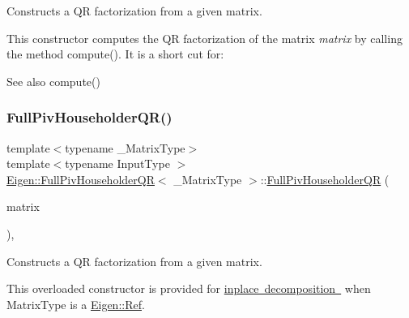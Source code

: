 Constructs a QR factorization from a given matrix. 

This constructor computes the QR factorization of the matrix {\itshape matrix} by calling the method compute(). It is a short cut for\+:


\begin{DoxyCode}{0}
\end{DoxyCode}


\begin{DoxySeeAlso}{See also}
compute() 
\end{DoxySeeAlso}
\mbox{\label{class_eigen_1_1_full_piv_householder_q_r_ac9bdb4f7fa77c1aa16f238592c248e70}} 
\subsubsection{\texorpdfstring{FullPivHouseholderQR()}{FullPivHouseholderQR()}\hspace{0.1cm}{\footnotesize\ttfamily [4/4]}}
{\footnotesize\ttfamily template$<$typename \+\_\+\+Matrix\+Type$>$ \\
template$<$typename Input\+Type $>$ \\
\mbox{\hyperlink{class_eigen_1_1_full_piv_householder_q_r}{Eigen\+::\+Full\+Piv\+Householder\+QR}}$<$ \+\_\+\+Matrix\+Type $>$\+::\mbox{\hyperlink{class_eigen_1_1_full_piv_householder_q_r}{Full\+Piv\+Householder\+QR}} (\begin{DoxyParamCaption}\item[{\mbox{\hyperlink{struct_eigen_1_1_eigen_base}{Eigen\+Base}}$<$ Input\+Type $>$ \&}]{matrix }\end{DoxyParamCaption})\hspace{0.3cm}{\ttfamily [inline]}, {\ttfamily [explicit]}}



Constructs a QR factorization from a given matrix. 

This overloaded constructor is provided for \mbox{\hyperlink{}{inplace decomposition }} when {\ttfamily Matrix\+Type} is a \mbox{\hyperlink{class_eigen_1_1_ref}{Eigen\+::\+Ref}}.

